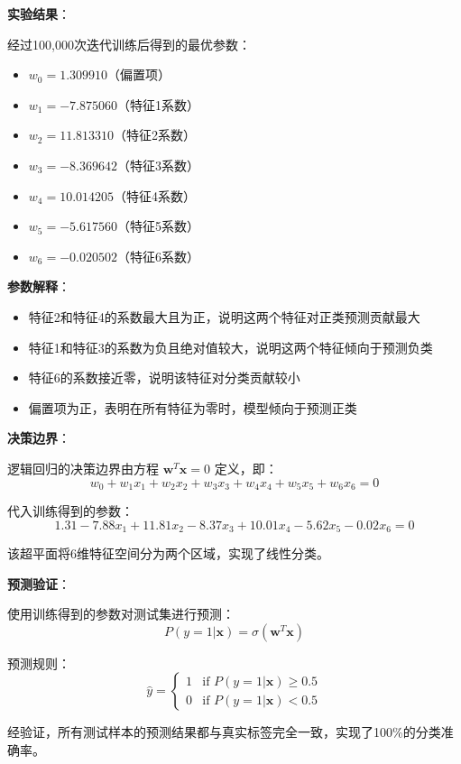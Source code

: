 \documentclass[a4paper]{article}
\begin{document}
\textbf{实验结果}：

经过100,000次迭代训练后得到的最优参数：
\begin{itemize}
    \item $w_0 = 1.309910$（偏置项）
    \item $w_1 = -7.875060$（特征1系数）
    \item $w_2 = 11.813310$（特征2系数）
    \item $w_3 = -8.369642$（特征3系数）
    \item $w_4 = 10.014205$（特征4系数）
    \item $w_5 = -5.617560$（特征5系数）
    \item $w_6 = -0.020502$（特征6系数）
\end{itemize}

\textbf{参数解释}：
\begin{itemize}
    \item 特征2和特征4的系数最大且为正，说明这两个特征对正类预测贡献最大
    \item 特征1和特征3的系数为负且绝对值较大，说明这两个特征倾向于预测负类
    \item 特征6的系数接近零，说明该特征对分类贡献较小
    \item 偏置项为正，表明在所有特征为零时，模型倾向于预测正类
\end{itemize}

\textbf{决策边界}：

逻辑回归的决策边界由方程 $\mathbf{w}^T \mathbf{x} = 0$ 定义，即：
$$w_0 + w_1 x_1 + w_2 x_2 + w_3 x_3 + w_4 x_4 + w_5 x_5 + w_6 x_6 = 0$$

代入训练得到的参数：
$$1.31 - 7.88x_1 + 11.81x_2 - 8.37x_3 + 10.01x_4 - 5.62x_5 - 0.02x_6 = 0$$

该超平面将6维特征空间分为两个区域，实现了线性分类。

\textbf{预测验证}：

使用训练得到的参数对测试集进行预测：
$$P(y=1|\mathbf{x}) = \sigma(\mathbf{w}^T \mathbf{x})$$

预测规则：
$$\hat{y} = \begin{cases} 1 & \text{if } P(y=1|\mathbf{x}) \geq 0.5 \\ 0 & \text{if } P(y=1|\mathbf{x}) < 0.5 \end{cases}$$

经验证，所有测试样本的预测结果都与真实标签完全一致，实现了100\%的分类准确率。
\end{document}
